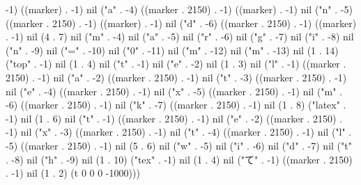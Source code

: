 -1) ((marker) . -1) nil ("a" . -4) ((marker . 2150) . -1) ((marker) . -1) nil ("n" . -5) ((marker . 2150) . -1) ((marker) . -1) nil ("d" . -6) ((marker . 2150) . -1) ((marker) . -1) nil (4 . 7) nil ("m" . -4) nil ("a" . -5) nil ("r" . -6) nil ("g" . -7) nil ("i" . -8) nil ("n" . -9) nil ("=" . -10) nil ("0" . -11) nil ("m" . -12) nil ("m" . -13) nil (1 . 14) ("top" . -1) nil (1 . 4) nil ("t" . -1) nil ("e" . -2) nil (1 . 3) nil ("l" . -1) ((marker . 2150) . -1) nil ("a" . -2) ((marker . 2150) . -1) nil ("t" . -3) ((marker . 2150) . -1) nil ("e" . -4) ((marker . 2150) . -1) nil ("x" . -5) ((marker . 2150) . -1) nil ("m" . -6) ((marker . 2150) . -1) nil ("k" . -7) ((marker . 2150) . -1) nil (1 . 8) ("latex" . -1) nil (1 . 6) nil ("t" . -1) ((marker . 2150) . -1) nil ("e" . -2) ((marker . 2150) . -1) nil ("x" . -3) ((marker . 2150) . -1) nil ("t" . -4) ((marker . 2150) . -1) nil ("l" . -5) ((marker . 2150) . -1) nil (5 . 6) nil ("w" . -5) nil ("i" . -6) nil ("d" . -7) nil ("t" . -8) nil ("h" . -9) nil (1 . 10) ("tex" . -1) nil (1 . 4) nil ("て" . -1) ((marker . 2150) . -1) nil (1 . 2) (t 0 0 0 -1000)))
